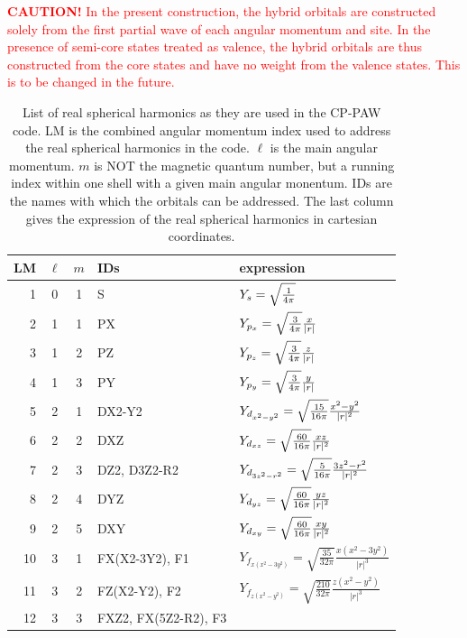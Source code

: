 \documentclass[final,12pt,makeidx,DIV=calc]{article}
\begin{document}
{{{{{{\textcolor{red}{\textbf{CAUTION!} In the present construction, the
  hybrid orbitals are constructed solely from the first partial wave
  of each angular momentum and site. In the presence of semi-core
  states treated as valence, the hybrid orbitals are thus constructed
  from the core states and have no weight from the valence
  states. This is to be changed in the future.}


\begin{table}[!hbt]
\caption{\label{tab:realsphericalharmonics}List of real spherical
  harmonics as they are used in the CP-PAW code. LM is the combined
  angular momentum index used to address the real spherical harmonics
  in the code. $\ell$ is the main angular momentum. $m$ is NOT the
  magnetic quantum number, but a running index within one shell with a
  given main angular monentum. IDs are the names with which the
  orbitals can be addressed. The last column gives the expression of
  the real spherical harmonics in cartesian coordinates.}
\begin{center}
\begin{tabular}{|r|c|c|l|l|}
\hline
LM & $\ell$ & $m$ & IDs & expression \\
\hline
1 & 0 & 1 & S   & $Y_s=\sqrt{1\over{4\pi}}$ \\
\hline
2 & 1 & 1 & PX  & $Y_{p_x}=\sqrt{3\over{4\pi}} {x\over{|r|}}$\\
3 & 1 & 2 & PZ  & $Y_{p_z}=\sqrt{3\over{4\pi}} {z\over{|r|}}$\\
4 & 1 & 3 & PY  & $Y_{p_y}=\sqrt{3\over{4\pi}} {y\over{|r|}}$\\
\hline
5 & 2 & 1  & DX2-Y2
                & $Y_{d_{x^2-y^2}}=\sqrt{15\over{16\pi}} {{x^2-y^2}\over{|r|^2}}$\\
6 & 2 & 2 & DXZ & $Y_{d_{xz}}=\sqrt{60\over{16\pi}} {{xz}\over{|r|^2}}$\\
7 & 2 & 3 & DZ2, D3Z2-R2 
                & $Y_{d_{3z^2-r^2}}=\sqrt{5\over{16\pi}} {{3z^2-r^2}\over{|r|^2}}$\\
8 & 2 & 4 & DYZ & $Y_{d_{yz}}=\sqrt{60\over{16\pi}} {{yz}\over{|r|^2}}$\\
9 & 2 & 5 & DXY & $Y_{d_{xy}}=\sqrt{60\over{16\pi}} {{xy}\over{|r|^2}}$\\
\hline
10 & 3 & 1 & FX(X2-3Y2), F1 
   & $Y_{f_{x(x^2-3y^2)}}=\sqrt{\frac{35}{32\pi}} \frac{x(x^2-3y^2)}{|r|^3}$\\
11 & 3 & 2 & FZ(X2-Y2), F2
   & $Y_{f_{z(x^2-y^2)}}=\sqrt{\frac{210}{32\pi}} \frac{z(x^2-y^2)}{|r|^3}$\\
12 & 3 & 3 & FXZ2, FX(5Z2-R2), F3 

\end{tabular}
\end{center}
\end{table}}}}}}}
\end{document}
